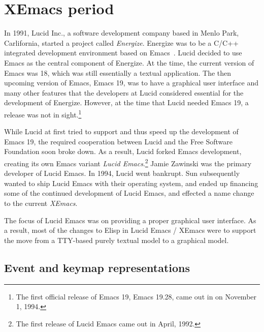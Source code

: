 \documentclass[format=acmsmall, review=false, screen=true]{acmart}
\newcommand \Elisp {Elisp}
\begin{document}
\section{XEmacs period}         %
\label{sec:xemacs}
  
In 1991, Lucid Inc., a software development company based in Menlo
Park, Carlifornia, started a project called \emph{Energize}.
Energize was to be a C/C++ integrated development environment based on
Emacs~\cite{GabrielLetter}.  Lucid decided to use Emacs as the central
component of Energize.  At the time, the current version of Emacs was
18, which was still essentially a textual application.  The then
upcoming version of Emacs, Emacs 19, was to have a graphical user
interface and many other features that the developers at Lucid
considered essential for the development of Energize.  However, at the
time that Lucid needed Emacs 19, a release was not in
sight.\footnote{The first official release of Emacs 19, Emacs
  19.28, came out in on November 1, 1994.}

While Lucid at first tried to support and thus speed up the
development of Emacs 19, the required cooperation between Lucid and
the Free Software Foundation soon broke down.  As a result, Lucid
forked Emacs development, creating its own Emacs variant \emph{Lucid
Emacs}.\footnote{The first release of Lucid Emacs came out in April,
1992.}  Jamie Zawinski was the primary developer of Lucid Emacs.
In 1994, Lucid went bankrupt.  Sun subsequently wanted to ship
Lucid Emacs with their operating system, and ended up financing some
of the continued development of Lucid Emacs, and effected a name
change to the current \emph{XEmacs}.

The focus of Lucid Emacs was on providing a proper graphical user
interface.  As a result, most of the changes to \Elisp{} in Lucid
Emacs / XEmacs were to support the move from a TTY-based purely
textual model to a graphical model.

\subsection{Event and keymap representations}
\end{document}
